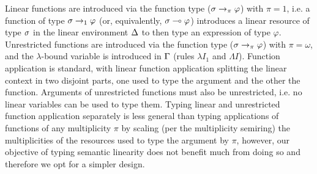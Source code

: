 \documentclass[acmsmall,review,anonymous,screen]{acmart}
\newcommand{\lolli}{\multimap}
\begin{document}
Linear functions are introduced via the function type ($\sigma \to_\pi \varphi$) with
$\pi = 1$, i.e. a function of type $\sigma \to_1 \varphi$ (or, equivalently, $\s \lolli \vp$)
introduces a linear resource of type $\sigma$ in the linear environment $\Delta$ to then type an expression of type $\varphi$.
%
Unrestricted functions are introduced via the function type ($\sigma \to_\pi \varphi$) with $\pi =
\omega$, and the $\lambda$-bound variable is introduced in $\Gamma$ (rules
$\lambda I_1$ and $\Lambda I$). Function application is standard, with
linear function application splitting the linear context in two
disjoint parts, one used to type the argument and the other the
function.
Arguments of unrestricted functions must also be unrestricted, i.e. no
linear variables can be used to type them. 
%
Typing linear and unrestricted function application separately is less
general than typing applications of functions of any multiplicity
$\pi$ by scaling (per the multiplicity semiring) the multiplicities of
the resources used to type the argument by $\pi$, however, our
objective of typing semantic linearity does not benefit much from
doing so and therefore we opt for a simpler design.
\end{document}
